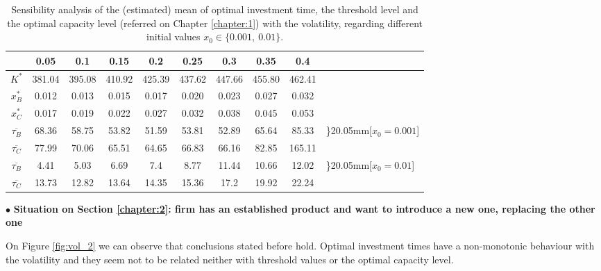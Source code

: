 \begin{table}[!ht]
	\centering
	\caption{Sensibility analysis of the (estimated) mean of optimal investment time, the threshold level and the optimal capacity level (referred on Chapter \ref{chapter:1}) with the volatility, regarding different initial values $x_0 \in \{0.001, \ 0.01\}$.}
	\begin{tabular}{c|ccccccccl}
		\hline
		\text{ $\sigma $ } & 0.05 & 0.1 & 0.15 & 0.2 & 0.25 & 0.3 & 0.35 & 0.4 \\ \hline
		$K^*$ & 381.04 & 395.08 & 410.92 & 425.39 & 437.62 & 447.66 & 455.80 & 462.41 \\
		$x_B^*$ & 0.012 & 0.013 & 0.015 & 0.017 & 0.020 & 0.023 & 0.027 & 0.032 \\
		$x_C^*$ & 0.017 & 0.019 & 0.022 & 0.027 & 0.032 & 0.038 & 0.045 & 0.053 \\ \hline
	   $\overline{\tau _B}$ & 68.36 & 58.75 & 53.82 & 51.59 & 53.81 & 52.89 & 65.64 & 85.33 & \rdelim\}{2}{0.05mm}[$x_0=0.001$]  \\
		$\overline{\tau _C}$ & 77.99 & 70.06 & 65.51 & 64.65 & 66.83 & 66.16 & 82.85 & 165.11 \\ \hline
		$\overline{\tau _B}$ & 4.41 & 5.03 & 6.69 & 7.4 & 8.77 & 11.44 & 10.66 & 12.02 &	\rdelim\}{2}{0.05mm}[$x_0=0.01$] \\
		$\overline{\tau _C}$ & 13.73 & 12.82 & 13.64 & 14.35 & 15.36 & 17.2 & 19.92 & 22.24 \\ \hline
	\end{tabular}
\label{tab:vol_1}
\end{table}



\pagebreak

$\bullet$ \textbf{Situation on Section \ref{chapter:2}: firm has an established product and want to introduce a new one, replacing the other one}


On Figure \ref{fig:vol_2} we can observe that conclusions stated before hold. Optimal investment times have a non-monotonic behaviour with the volatility and they seem not to be related neither with threshold values or the optimal capacity level. 

